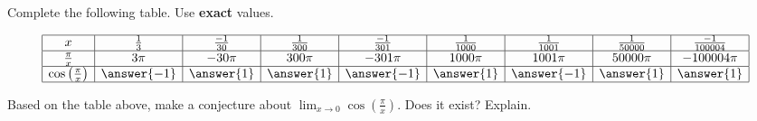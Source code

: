\documentclass{ximera}
\author{Nela Lakos \and Kyle Parsons \and Bobby Ramsey}
\begin{document}
\begin{exercise}

Complete the following table.  Use \textbf{exact} values.

\[
\begin{array}{|c|c|c|c|c|c|c|c|c|}
\hline
x & \frac{1}{3} & \frac{-1}{30} & \frac{1}{300} & \frac{-1}{301} & \frac{1}{1000} & \frac{1}{1001} & \frac{1}{50000} & \frac{-1}{100004}\\\hline
\frac{\pi}{x} & 3\pi & -30\pi & 300\pi & -301\pi & 1000\pi & 1001\pi & 50000\pi & -100004\pi \\\hline
\cos\left(\frac{\pi}{x}\right) & \answer{-1} & \answer{1} & \answer{1} & \answer{-1} & \answer{1} & \answer{-1} & \answer{1} & \answer{1} \\\hline
\end{array}
\]

\begin{exercise}
Based on the table above, make a conjecture about $\lim_{x\to0}\cos\left(\frac{\pi}{x}\right)$.  Does it exist? Explain.
\begin{multipleChoice}
\end{multipleChoice}
\end{exercise}

\end{exercise}
\end{document}
